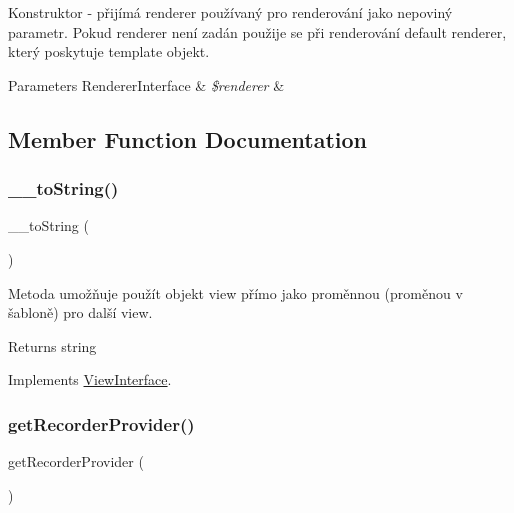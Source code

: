 Konstruktor -\/ přijímá renderer používaný pro renderování jako nepoviný parametr. Pokud renderer není zadán použije se při renderování default renderer, který poskytuje template objekt. 
\begin{DoxyParams}[1]{Parameters}
Renderer\+Interface & {\em \$renderer} & \\
\hline
\end{DoxyParams}


\subsection{Member Function Documentation}
\mbox{\label{class_pes_1_1_view_1_1_view_a7516ca30af0db3cdbf9a7739b48ce91d}} 
\subsubsection{\texorpdfstring{\+\_\+\+\_\+to\+String()}{\_\_toString()}}
{\footnotesize\ttfamily \+\_\+\+\_\+to\+String (\begin{DoxyParamCaption}{ }\end{DoxyParamCaption})}

Metoda umožňuje použít objekt view přímo jako proměnnou (proměnou v šabloně) pro další view.

\begin{DoxyReturn}{Returns}
string 
\end{DoxyReturn}


Implements \mbox{\hyperlink{interface_pes_1_1_view_1_1_view_interface}{View\+Interface}}.

\mbox{\label{class_pes_1_1_view_1_1_view_a8e0a6cf7028aff1ada59a30dab75adf0}} 
\subsubsection{\texorpdfstring{get\+Recorder\+Provider()}{getRecorderProvider()}}
{\footnotesize\ttfamily get\+Recorder\+Provider (\begin{DoxyParamCaption}{ }\end{DoxyParamCaption})}

